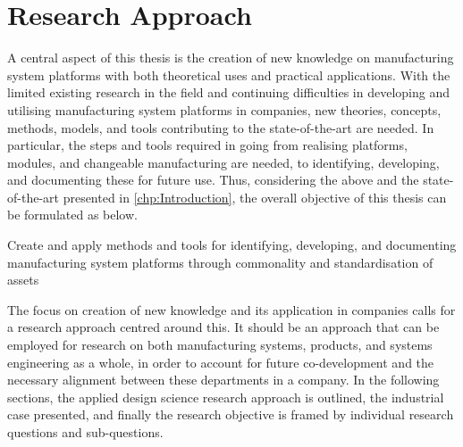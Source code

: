 \chapter{Research Approach}\label{chp:Approach}
A central aspect of this thesis is the creation of new knowledge on manufacturing system platforms with both theoretical uses and practical applications.
With the limited existing research in the field and continuing difficulties in developing and utilising manufacturing system platforms in companies, new theories, concepts, methods, models, and tools contributing to the state-of-the-art are needed.
In particular, the steps and tools required in going from realising platforms, modules, and changeable manufacturing are needed, to identifying, developing, and documenting these for future use.
Thus, considering the above and the state-of-the-art presented in \cref{chp:Introduction}, the overall objective of this thesis can be formulated as below.
\begin{objective}
Create and apply methods and tools for identifying, developing, and documenting manufacturing system platforms through commonality and standardisation of assets
\end{objective}
The focus on creation of new knowledge and its application in companies calls for a research approach centred around this.
It should be an approach that can be employed for research on both manufacturing systems, products, and systems engineering as a whole, in order to account for future co-development and the necessary alignment between these departments in a company.
In the following sections, the applied design science research approach is outlined, the industrial case presented, and finally the research objective is framed by individual research questions and sub-questions. 




